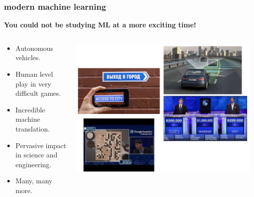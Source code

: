 \documentclass[handout,compress]{beamer}
\begin{document}
\begin{frame}
	\frametitle{modern machine learning}
	\begin{center}
	\textbf{\large You could not be studying ML at a more exciting time!}
	\end{center}
	
	\begin{columns}
		\begin{column}{.6\textwidth}
			\begin{itemize}
				\item Autonomous vehicles.
				\item Human level play in very difficult games. 
				\item Incredible machine translation.
				\item Pervasive impact in science and engineering.
				\item Many, many more.
			\end{itemize}
		\end{column}
		\begin{column}{.5\textwidth}
			\begin{center}
				\includegraphics[width=\textwidth]{applications.png}
			\end{center}
		\end{column}
	\end{columns}
\end{frame}
\end{document}
